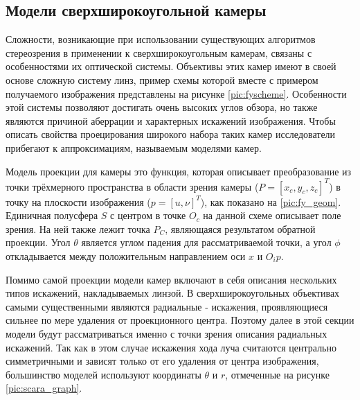 \subsection{Модели сверхширокоугольной камеры}
\label{camera_model}
Сложности, возникающие при использовании существующих алгоритмов стереозрения  в применении к сверхширокоугольным камерам, связаны с
 особенностями их оптической системы. Объективы  этих камер имеют в своей основе сложную систему линз, пример схемы которой вместе с примером
 получаемого изображения представлены на рисунке \ref{pic:fyscheme}. Особенности этой системы позволяют достигать очень высоких углов обзора,
  но также являются причиной аберрации и характерных искажений изображения. Чтобы описать свойства проецирования широкого набора таких
камер исследователи прибегают к аппроксимациям, называемым моделями камер. 


Модель проекции для камеры это функция, которая описывает преобразование из точки трёхмерного пространства  в области зрения 
камеры ($P=[x_c, y_c, z_c]^T$) в точку на плоскости изображения ($p=[u, \nu]^T$), как показано на \ref{pic:fy_geom}. Единичная            %
полусфера $S$ с центром в точке $O_c$ на данной схеме описывает поле зрения. На ней также лежит точка $P_C$, являющаяся результатом обратной проекции.    %
Угол $\theta$ является углом падения для рассматриваемой точки, а угол $\phi$ откладывается между положительным направлением оси $x$ и $O_{i}{p}$. 

Помимо самой проекции модели камер включают в себя описания нескольких типов искажений, накладываемых линзой. В сверхширокоугольных объективах самыми существенными являются 
радиальные - искажения, проявляющиеся сильнее по мере удаления от проекционного центра. Поэтому далее в этой секции модели будут рассматриваться именно с точки зрения 
описания радиальных искажений. Так как в этом случае искажения хода луча считаются центрально симметричными и зависят только от его удаления от центра изображения, 
большинство моделей используют координаты $\theta$ и  $r$, отмеченные на рисунке \ref{pic:scara_graph}.


